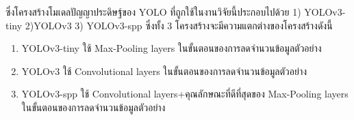 \par ซึ่งโครงสร้างโมเดลปัญญาประดิษฐ์ของ YOLO ที่ถูกใช้ในงานวิจัยนี้ประกอบไปด้วย 1) YOLOv3-tiny 2)YOLOv3 3) YOLOv3-spp	ซึ่งทั้ง 3 โครงสร้างจะมีความแตกต่างของโครงสร้างดังนี้
\begin{enumerate}
	\setlength\itemsep{-0.25em}
	\item YOLOv3-tiny ใช้ Max-Pooling layers ในขั้นตอนของการลดจำนวนข้อมูลตัวอย่าง
	\item YOLOv3 ใช้ Convolutional layers ในขั้นตอนของการลดจำนวนข้อมูลตัวอย่าง
	\item YOLOv3-spp ใช้ Convolutional layers+คุณลักษณะที่ดีที่สุดของ Max-Pooling layers ในขั้นตอนของการลดจำนวนข้อมูลตัวอย่าง
\end{enumerate}

\begin{figure}[!ht]
    \centering
    \begin{subfigure}[b]{0.2\textwidth}
        \centering

\end{subfigure}
\end{figure}
